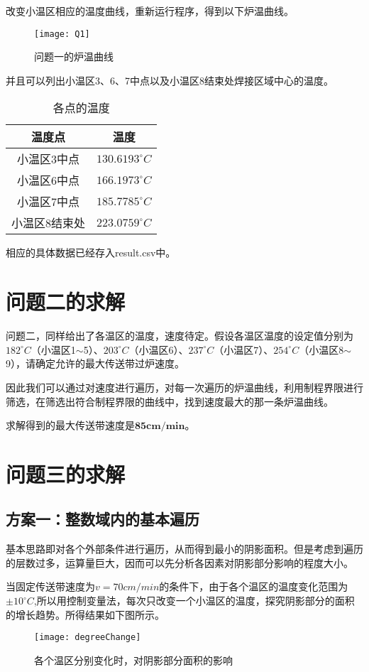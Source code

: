 \documentclass[withoutpreface,bwprint]{cumcmthesis} %
\begin{document}
改变小温区相应的温度曲线，重新运行程序，得到以下炉温曲线。
\begin{figure}[!h]
	\centering
	\texttt{[image: Q1]}
	\caption{问题一的炉温曲线}
	\label{fig:Q1}
\end{figure}

并且可以列出小温区3、6、7中点以及小温区8结束处焊接区域中心的温度。
\newpage
\begin{table}[!htb]
	\centering
	\caption{各点的温度}
	\begin{tabular}{cc}
		\toprule[1.5pt]
		温度点 & 温度\\
		\midrule[1pt]
		小温区3中点 & $130.6193^{\circ}C$\\
		小温区6中点 & $166.1973^{\circ}C$\\
		小温区7中点 & $185.7785^{\circ}C$\\
		小温区8结束处 & $223.0759^{\circ}C$\\

		\bottomrule[1.5pt]
	\end{tabular}
\end{table}

相应的具体数据已经存入result.csv中。

\section{问题二的求解}
问题二，同样给出了各温区的温度，速度待定。假设各温区温度的设定值分别为$182^{\circ}C$（小温区1$\sim$5）、$203^{\circ}C$（小温区6）、$237^{\circ}C$（小温区7）、$254^{\circ}C$（小温区8$\sim$9），请确定允许的最大传送带过炉速度。

因此我们可以通过对速度进行遍历，对每一次遍历的炉温曲线，利用制程界限进行筛选，在筛选出符合制程界限的曲线中，找到速度最大的那一条炉温曲线。


求解得到的最大传送带速度是$\textbf{85cm/min}$。


\section{问题三的求解}
\subsection{方案一：整数域内的基本遍历}
基本思路即对各个外部条件进行遍历，从而得到最小的阴影面积。但是考虑到遍历的层数过多，运算量巨大，因而可以先分析各因素对阴影部分影响的程度大小。

当固定传送带速度为$v = 70cm/min$的条件下，由于各个温区的温度变化范围为$\pm10^{\circ}C$,所以用控制变量法，每次只改变一个小温区的温度，探究阴影部分的面积的增长趋势。所得结果如下图所示。
\newpage
\begin{figure}[!h]
	\centering
	\texttt{[image: degreeChange]}
	\caption{各个温区分别变化时，对阴影部分面积的影响}
	\label{fig:deC}
\end{figure}
\end{document}
